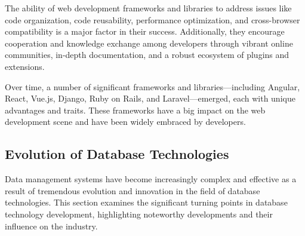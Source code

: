 \par The ability of web development frameworks and libraries to address issues like code organization, code reusability, performance optimization, and cross-browser compatibility is a major factor in their success. Additionally, they encourage cooperation and knowledge exchange among developers through vibrant online communities, in-depth documentation, and a robust ecosystem of plugins and extensions.

\par Over time, a number of significant frameworks and libraries—including Angular, React, Vue.js, Django, Ruby on Rails, and Laravel—emerged, each with unique advantages and traits. These frameworks have a big impact on the web development scene and have been widely embraced by developers. \cite{vue} \cite{django} \cite{ruby} \cite{laravel}

\subsection{Evolution of Database Technologies}
\par Data management systems have become increasingly complex and effective as a result of tremendous evolution and innovation in the field of database technologies. This section examines the significant turning points in database technology development, highlighting noteworthy developments and their influence on the industry.

